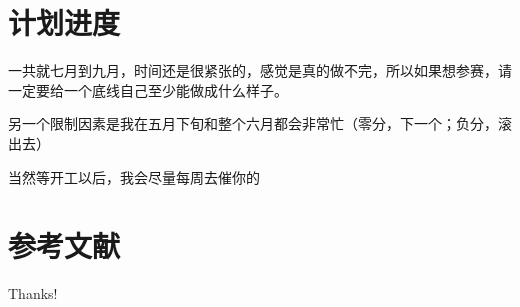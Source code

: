 \documentclass{beamer}
\begin{document}
\section{计划进度}
\begin{frame}
    一共就七月到九月，时间还是很紧张的，感觉是真的做不完，所以如果想参赛，请一定要给一个底线自己至少能做成什么样子。

    另一个限制因素是我在五月下旬和整个六月都会非常忙（零分，下一个；负分，滚出去）

    当然等开工以后，我会尽量每周去催你的
\end{frame}


\section{参考文献}

\begin{frame}[allowframebreaks]
    
    
\end{frame}

\begin{frame}
    \begin{center}
        {\Huge\calligra Thanks!}
    \end{center}
\end{frame}
\end{document}
